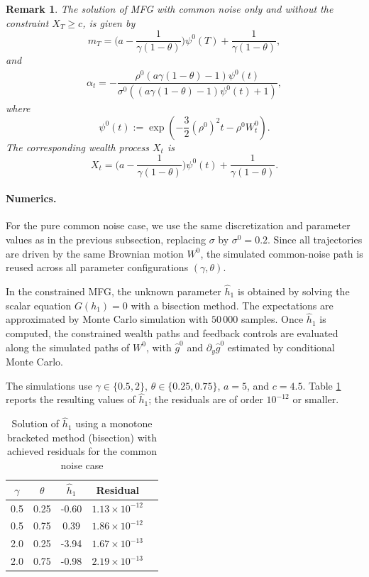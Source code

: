 \documentclass[11pt,a4paper]{article}
\newtheorem{rem}[theo]{Remark}
\begin{document}
\begin{rem}
   The solution of MFG with  common noise only and without the constraint $X_T \geq c$, is given by 
   \begin{equation*}
 m_T=\bigg(a-\frac{1}{\gamma(1-\theta)}\bigg)\psi^0(T)+\frac{1}{\gamma(1-\theta)},
\end{equation*}
and 
\begin{equation*}
    \begin{aligned}
       \alpha_t=-\dfrac{\rho^0 (a \gamma(1-\theta)-1)\psi^0(t)}{\sigma^0 ((a\gamma(1-\theta)-1)\psi^0(t)+1)},
    \end{aligned}
\end{equation*}
where
$$\psi^0(t):=\exp \left(-\frac{3}{2}(\rho^0)^2t - \rho^0  W_t^0\right).$$ The corresponding  wealth process ${X}_t$ is
 $$X_t=\bigg(a-\frac{1}{\gamma(1-\theta)}\bigg) \psi^0(t) +\frac{1}{\gamma(1-\theta)}.$$
\end{rem}


\paragraph{Numerics.}

For the pure common noise case, we use the same discretization and parameter values as in the previous subsection, replacing $\sigma$ by $\sigma^0=0.2$. Since all trajectories are driven by the same Brownian motion $W^0$, the simulated common-noise path is reused across all parameter configurations $(\gamma,\theta)$.

In the constrained MFG, the unknown parameter $\hat h_1$ is obtained by solving the scalar equation $G(h_1)=0$ with a bisection method. The expectations are approximated by Monte Carlo simulation with $50\,000$ samples. Once $\hat h_1$ is computed, the constrained wealth paths and feedback controls are evaluated along the simulated paths of $W^0$, with $\hat g^0$ and $\partial_y \hat g^0$ estimated by conditional Monte Carlo.

The simulations use $\gamma \in \{0.5,2\}$, $\theta \in \{0.25,0.75\}$, $a=5$, and $c=4.5$. Table \ref{tab:h1_residuals_common} reports the resulting values of $\hat h_1$; the residuals are of order $10^{-12}$ or smaller.

\begin{table}[h!]
\centering
\caption{Solution of $\hat h_1$ using a monotone bracketed method (bisection) with achieved residuals for the common noise case}
\begin{tabular}{ccccc}  
\hline
$\gamma$ & $\theta$ & $\hat h_1$ & Residual  \\
\hline
0.5 & 0.25 & -0.60 & $1.13\times 10^{-12}$ \\
0.5 & 0.75 &  0.39 & $ 1.86\times 10^{-12}$  \\
2.0 & 0.25 & -3.94 & $1.67\times 10^{-13}$  \\
2.0 & 0.75 & -0.98 & $ 2.19\times 10^{-13}$  \\
\hline
\end{tabular}
\label{tab:h1_residuals_common}
\end{table}
\end{document}

